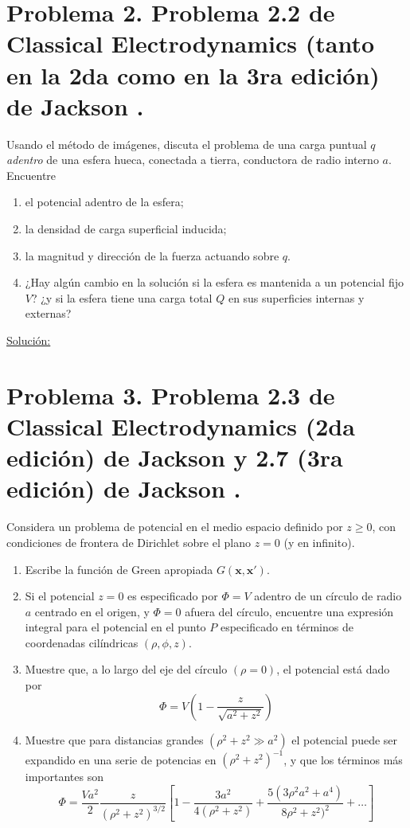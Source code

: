 \documentclass[a4paper,10pt]{article}
\numberwithin{equation}{section}
\begin{document}
\section{Problema 2. Problema 2.2 de Classical Electrodynamics (tanto en la 2da 
como en la 3ra edición) de Jackson \cite{jackson2,jackson3}.}

Usando el método de imágenes, discuta el problema de una carga puntual $q$ 
\emph{adentro} de una esfera hueca, conectada a tierra, conductora de radio interno
$a$. Encuentre 

\begin{enumerate}[label=\textbf{(\alph*)}]
 \item el potencial adentro de la esfera;
 \item la densidad de carga superficial inducida;
 \item la magnitud y dirección de la fuerza actuando sobre $q$.
 \item ¿Hay algún cambio en la solución si la esfera es mantenida a un potencial 
 fijo $V$? ¿y si la esfera tiene una carga total $Q$ en sus superficies internas y 
 externas?
\end{enumerate}

\vspace{.3cm}

\underline{Solución:} \vspace{.3cm}

\section{Problema 3. Problema 2.3 de Classical Electrodynamics (2da edición) de Jackson 
\cite{jackson2} y 2.7 (3ra edición) de Jackson \cite{jackson3}.}

Considera un problema de potencial en el medio espacio definido por $z \geq 0$, con 
condiciones de frontera de Dirichlet sobre el plano $z = 0$ (y en infinito).

\begin{enumerate}[label=\textbf{(\alph*)}]
 \item Escribe la función de Green apropiada $G(\mathbf{x},\mathbf{x}')$.
 \item Si el potencial $z = 0$ es especificado por $\Phi = V$ adentro de un círculo 
 de radio $a$ centrado en el origen, y $\Phi = 0$ afuera del círculo, encuentre 
 una expresión integral para el potencial en el punto $P$ especificado en términos 
 de coordenadas cilíndricas $(\rho,\phi,z)$.
 \item Muestre que, a lo largo del eje del círculo $(\rho = 0)$, el potencial está 
 dado por 
 $$
 \Phi = V\left(1 - \frac{z}{\sqrt{a^2+z^2}}\right)
 $$
 \item Muestre que para distancias grandes $(\rho^2 + z^2 \gg a^2)$ el potencial 
 puede ser expandido en una serie de potencias en $(\rho^2 + z^2)^{-1}$, y que 
 los términos más importantes son 
 $$
 \Phi = \frac{Va^2}{2}\frac{z}{(\rho^2 + z^2)^{3/2}}\left[1 - 
 \frac{3a^2}{4(\rho^2 + z^2)} + \frac{5(3\rho^2a^2+a^4)}{8\rho^2 + z^2)^2} 
 + \dots \right]
 $$
\end{enumerate}
\end{document}
